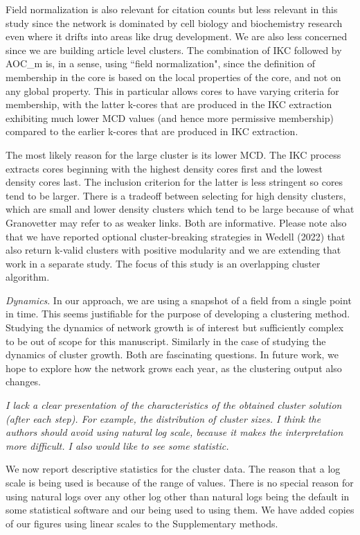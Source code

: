 \documentclass[11pt, oneside]{article}   	%
\begin{document}
Field normalization is also relevant for citation counts but less relevant in this study since the network is dominated by cell biology and biochemistry research even where it drifts into areas like drug development. We are also less concerned since we are building article level clusters. The combination of IKC followed by AOC\_m is, in a sense, using ``field normalization", since the definition of membership in the core is based on the local properties of the core, and not on any global property. This in particular allows cores to have varying criteria for membership, with the latter k-cores that are produced in the IKC extraction exhibiting much lower MCD values (and hence more permissive membership) compared to the earlier k-cores that are produced in IKC extraction. 

The most likely reason for the large cluster is its lower MCD. The IKC process extracts cores beginning with the highest density cores first and the lowest density cores last. The inclusion criterion for the latter is less stringent so cores tend to be larger. There is a tradeoff between selecting for high density clusters, which are small and lower density clusters which tend to be large because of what Granovetter may refer to as weaker links. Both are informative. Please note also that we have reported optional cluster-breaking strategies in Wedell (2022) that also return k-valid clusters with positive modularity and we are extending that work in a separate study. The focus of this study is an overlapping cluster algorithm.

\emph{Dynamics}. In our approach, we are using a snapshot of a field from a single point in time. This seems justifiable for the purpose of developing a clustering method. Studying the dynamics of network growth is of interest but sufficiently complex to be out of scope for this manuscript. Similarly in the case of studying the dynamics of cluster growth. Both are fascinating questions.  In future work,
we hope to explore how the network grows each year,  as the clustering output also changes. 
 
\emph{I lack a clear presentation of the characteristics of the obtained cluster solution (after each step). For example, the distribution of cluster sizes. I think the authors should avoid using natural log scale, because it makes the interpretation more difficult. I also would like to see some statistic.}

We now report descriptive statistics for the cluster data. The reason that a log scale is being used is because of the range of values. There is no special reason for using natural logs over any other log other than natural logs being the default in some statistical software and our being used to using them. We have added copies of our figures using linear scales to the Supplementary methods. 

\vspace{4 mm}
\end{document}
